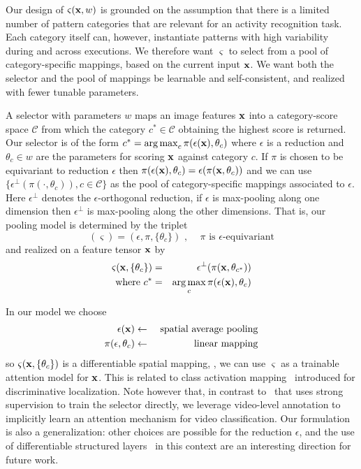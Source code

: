 \documentclass[10pt,twocolumn,letterpaper]{article}
\DeclareMathOperator*{\argmax}{arg\,max}
\newcommand{\io}[1]{{\bf #1}}
\begin{document}
Our design of $\varsigma(\io{x},w)$ is grounded on the assumption that there is a limited number of pattern categories that are relevant for an activity recognition task. Each category itself can, however, instantiate patterns with high variability during and across executions. We therefore want $\varsigma$ to select from a pool of category-specific mappings, based on the current input $\io{x}$. We want both the selector and the pool of mappings be learnable and self-consistent, and realized with fewer tunable parameters.

A selector with parameters $w$ maps an image features $\io{x}$ into a category-score space $\mathcal{C}$ from which the category $c^* \in \mathcal{C}$ obtaining the highest score is returned. Our selector is of the form $c^* = \argmax_c\pi(\epsilon(\io{x}),\theta_c)$ where $\epsilon$ is a reduction and $\theta_c \in w$ are the parameters for scoring $\io{x}$ against category $c$. If $\pi$ is chosen to be equivariant to reduction $\epsilon$ then $\pi(\epsilon(\io{x}), \theta_c) = \epsilon(\pi(\io{x}, \theta_c))$ and we can use $\{\epsilon^{\perp}(\pi(\cdot,\theta_c)), c \in \mathcal{C}\}$ as the pool of category-specific mappings associated to $\epsilon$. Here $\epsilon^{\perp}$ denotes the $\epsilon$-orthogonal reduction, \eg if $\epsilon$ is max-pooling along one dimension then $\epsilon^{\perp}$ is max-pooling along the other dimensions. That is, our pooling model is determined by the triplet
\begin{equation}
  (\varsigma) = (\epsilon, \pi, \{\theta_c\})\text{ , }\quad\pi\textrm{ is }\epsilon\text{-equivariant}
\end{equation}
and realized on a feature tensor $\io{x}$ by
\begin{eqnarray}
  \varsigma(\io{x},\{\theta_c\}) &=& \epsilon^{\perp}(\pi(\io{x},\theta_{c^*}))\label{eq:pooling.0}\\
  \textrm{where }c^* &=& \argmax_c\pi(\epsilon(\io{x}),\theta_c)\label{eq:pooling.1}
\end{eqnarray}

In our model we choose
\begin{eqnarray*}
  \epsilon(\io{x}) &\leftarrow& \text{ spatial average pooling}\\
  \pi(\epsilon,\theta_c) &\leftarrow& \text{ linear mapping}
\end{eqnarray*}
so $\varsigma(\io{x},\{\theta_c\})$ is a differentiable spatial mapping, \ie, we can use $\varsigma$ as a trainable attention model for $\io{x}$. This is related to class activation mapping~\cite{zhou15cnnlocalization} introduced for discriminative localization. Note however that, in contrast to~\cite{zhou15cnnlocalization} that uses strong supervision to train the selector directly, we leverage video-level annotation to implicitly learn an attention mechanism for video classification. Our formulation is also a generalization: other choices are possible for the reduction $\epsilon$, and the use of differentiable structured layers~\cite{sminchisescu15iccv} in this context are an interesting direction for future work.
\end{document}
